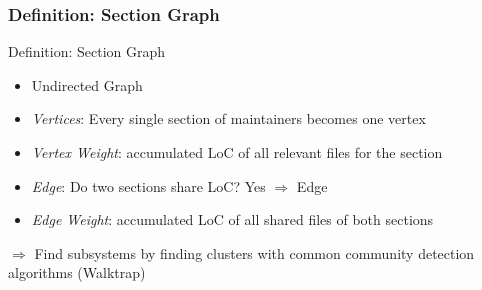 \documentclass{beamer}
\begin{document}
	\begin{frame}
	\frametitle{Definition: Section Graph}
		\begin{alertblock}{Definition: Section Graph}
			\begin{itemize}
				\item Undirected Graph
				\item \textit{Vertices}: Every single section of maintainers becomes one vertex
				\item \textit{Vertex Weight}: accumulated LoC of all relevant files for the section
				\item \textit{Edge}: Do two sections share LoC? Yes $\Rightarrow$ Edge
				\item \textit{Edge Weight}: accumulated LoC of all shared files of both sections
			\end{itemize}
		\end{alertblock}

		$\Rightarrow$ Find subsystems by finding clusters with common community detection algorithms (Walktrap) %
	\end{frame}
\end{document}
